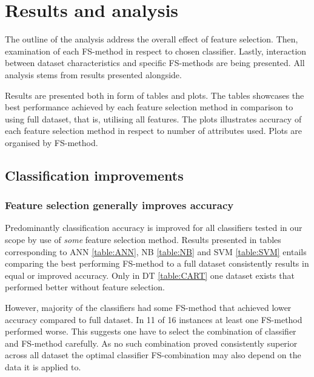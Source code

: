 \chapter{Results and analysis}

The outline of the analysis address the overall effect of feature selection. Then, examination of each FS-method in respect to chosen classifier. Lastly, interaction between dataset characteristics and specific FS-methods are being presented. All analysis stems from results presented alongside.

Results are presented both in form of tables and plots. The tables showcases the best performance achieved by each feature selection method in comparison to using full dataset, that is, utilising all features. The plots illustrates accuracy of each feature selection method in respect to number of attributes used. Plots are organised by FS-method.


\section{Classification improvements}

\subsection{Feature selection generally improves accuracy}

Predominantly classification accuracy is improved for all classifiers tested in our scope by use of \textit{some} feature selection method. Results presented in tables corresponding to ANN \ref{table:ANN}, NB \ref{table:NB} and SVM \ref{table:SVM} entails comparing the best performing FS-method to a full dataset consistently results in equal or improved accuracy. Only in DT \ref{table:CART} one dataset exists that performed better without feature selection.

However, majority of the classifiers had some FS-method that achieved lower accuracy compared to full dataset. In 11 of 16 instances at least one FS-method performed worse. This suggests one have to select the combination of classifier and FS-method carefully. As no such combination proved consistently superior across all dataset the optimal classifier FS-combination may also depend on the data it is applied to.

\begin{table}[htbp!]
   \\
  \caption[]%
  {{\small Classification accuracy achieved by ANN was improved on all datasets by the use of some feature selection method.}}
  \label{table:ANN}
\end{table}

